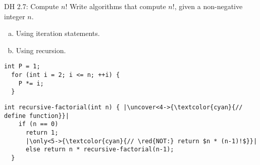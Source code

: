 \begin{frame}[fragile]{}
  \begin{exampleblock}{DH 2.7: Compute $n!$}
    Write algorithms that compute $n!$, given a non-negative integer $n$.
    \begin{enumerate}[(a)]
      \item Using iteration statements.
      \item Using recursion.
    \end{enumerate}
  \end{exampleblock}

  \pause
  \begin{lstlisting}[style = Cstyle]
  int P = 1;
  for (int i = 2; i <= n; ++i) {
    P *= i;
  }
  \end{lstlisting}

  \pause
  \begin{lstlisting}[style = Cstyle]
  int recursive-factorial(int n) { |\uncover<4->{\textcolor{cyan}{// define function}}|
    if (n == 0)
      return 1;
      |\only<5->{\textcolor{cyan}{// \red{NOT:} return $n * (n-1)!$}}|
      else return n * recursive-factorial(n-1); 
  }
  \end{lstlisting}
\end{frame}
